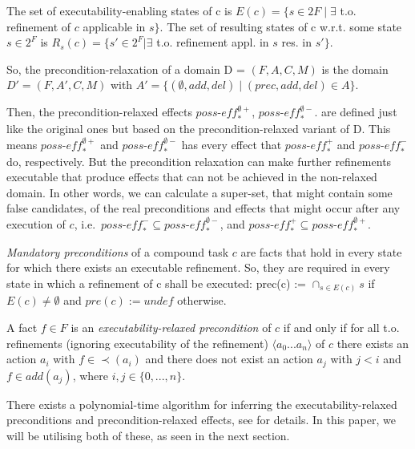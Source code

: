 \documentclass[letterpaper]{article} %
\newcommand{\Pre} {\ensuremath{\mathit{pre}}}  %
\newcommand{\PossEffPlus} {\ensuremath{\mathit{\textit{poss-eff}^{+}_{*}}}}
\newcommand{\PossEffMinus} {\ensuremath{\mathit{\textit{poss-eff}^{-}_{*}}}}
\newcommand{\RelPossEffPlus} {\ensuremath{\mathit{\textit{poss-eff}^{\emptyset +}_{*}}}}
\newcommand{\RelPossEffMinus} {\ensuremath{\mathit{\textit{poss-eff}^{\emptyset -}_{*}}}}
\begin{document}
The set of executability-enabling states of c is
$E(c) = \{s \in 2F  \mid  \exists$ t.o. refinement of $c$ applicable in $s \}$.
The set of resulting states of c w.r.t. some state $s \in 2^F$ is
$R_s(c) = \{s' \in 2^F | \exists$ t.o. refinement appl. in $s$ res. in $s' \}$.

So, the precondition-relaxation of a domain D = $(F, A, C, M)$ is the domain $D' = (F, A', C, M)$
with $A' = \{(\emptyset, add , del ) \mid (prec, add , del ) \in A\}$.

Then, the precondition-relaxed effects $\RelPossEffPlus$, $\RelPossEffMinus$. are defined just like the original ones but based on the precondition-relaxed variant of D.
This means $\RelPossEffPlus$ and $\RelPossEffMinus$ has every effect that $\PossEffPlus$ and $\PossEffMinus$  do, respectively. But
the precondition relaxation can make further refinements executable that produce
effects that can not be achieved in the non-relaxed domain. 
In other words, we can calculate a super-set, that might contain some false candidates, of the real preconditions and effects that might occur after any execution of $c$, i.e.\  $\PossEffMinus \subseteq \RelPossEffMinus$, and $\PossEffPlus  \subseteq \RelPossEffPlus$.

\emph{Mandatory preconditions} of a compound task $c$ are facts that hold in every state for which there exists an executable refinement. So, they are required in every state in which a refinement of c shall be executed: prec(c) := $\cap_{s \in E(c)}  s$
if $E(c) \neq \emptyset$ and $\Pre(c) := \ensuremath{\textit{undef}}$ otherwise.

A fact $f \in F$ is an \emph{executability-relaxed precondition} of $c$ if and only if for all t.o. refinements (ignoring executability of the refinement) $\langle a_0 ... a_n \rangle$ of $c$ there exists an action $a_i$ with $f \in \prec(a_i)$ and there does not exist an action $a_j$ with $j < i$ and $f \in add(a_j)$, where $i, j \in \{0, ..., n\}$.

There exists a polynomial-time algorithm for inferring the executability-relaxed preconditions and precondition-relaxed effects, see \cite{ConnyPreEstimation} for details.
In this paper, we will be utilising both of these, as seen in the next section.

\end{document}
